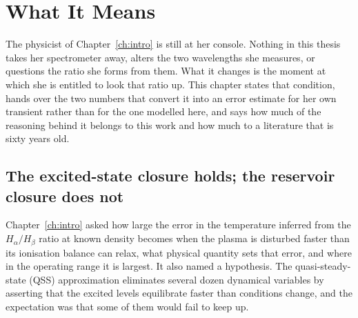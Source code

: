 %
%
%

\chapter{What It Means}
\label{ch:conclusions}

The physicist of Chapter~\ref{ch:intro} is still at her console. Nothing in this
thesis takes her spectrometer away, alters the two wavelengths she measures, or
questions the ratio she forms from them. What it changes is the moment at which
she is entitled to look that ratio up. This chapter states that condition, hands
over the two numbers that convert it into an error estimate for her own
transient rather than for the one modelled here, and says how much of the
reasoning behind it belongs to this work and how much to a literature that is
sixty years old.

\section{The excited-state closure holds; the reservoir closure does not}
\label{sec:what_found}

Chapter~\ref{ch:intro} asked how large the error in the temperature inferred
from the $H_\alpha/H_\beta$ ratio at known density becomes when the plasma is disturbed faster than
its ionisation balance can relax, what physical quantity sets that error, and
where in the operating range it is largest. It also named a hypothesis. The
quasi-steady-state (QSS) approximation eliminates several dozen dynamical
variables by asserting that the excited levels equilibrate faster than
conditions change, and the expectation was that some of them would fail to keep
up.

